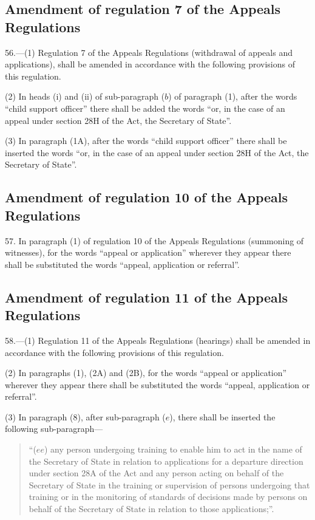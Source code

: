 \documentclass[12pt,a4paper]{article}
\begin{document}
\subsection[56. Amendment of regulation 7 of the Appeals Regulations]{Amendment of regulation 7 of the Appeals Regulations}

56.—(1) Regulation 7 of the
Appeals Regulations (withdrawal of appeals and applications), shall be amended
in accordance with the following provisions of this regulation.

(2) In heads (i) and (ii) of sub-paragraph ($b$) of paragraph (1), after the words
“child support officer” there shall be added the words “or, in the case of an
appeal under section 28H of the Act, the Secretary of State”.

(3) In paragraph (1A), after the words “child support officer” there shall be
inserted the words “or, in the case of an appeal under section 28H of the Act,
the Secretary of State”.

\subsection[57. Amendment of regulation 10 of the Appeals Regulations]{Amendment of regulation 10 of the Appeals Regulations}

57. In paragraph (1) of
regulation 10 of the Appeals Regulations (summoning of witnesses), for the words
“appeal or application” wherever they appear there shall be substituted the
words “appeal, application or referral”.

\subsection[58. Amendment of regulation 11 of the Appeals Regulations]{Amendment of regulation 11 of the Appeals Regulations}

58.—(1) Regulation 11 of
the Appeals Regulations (hearings) shall be amended in accordance with the
following provisions of this regulation.

(2) In paragraphs (1), (2A) and (2B), for the words “appeal or application”
wherever they appear there shall be substituted the words “appeal, application
or referral”.

(3) In paragraph (8), after sub-paragraph ($e$), there shall be inserted the
following sub-paragraph—
\begin{quotation}
“($ee$) any person undergoing training to enable him to act in the name of the
Secretary of State in relation to applications for a departure direction under
section 28A of the Act and any person acting on behalf of the Secretary of State
in the training or supervision of persons undergoing that training or in the
monitoring of standards of decisions made by persons on behalf of the Secretary
of State in relation to those applications;”.
\end{quotation}
\end{document}

